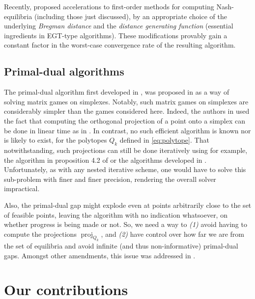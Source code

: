 \documentclass[a4paper,9pt]{extarticle}
\DeclareMathOperator{\proj}{proj}
\begin{document}
Recently, \cite{kroer2015} proposed accelerations to first-order
methods for computing Nash-equilibria (including those just
discussed), by an appropriate choice of the underlying \textit{Bregman
distance} and the \textit{distance generating function} (essential
ingredients in EGT-type algorithms). These modifications provably
gain a constant factor in the worst-case convergence rate of the
resulting algorithm. %

\subsection{Primal-dual algorithms}
The primal-dual algorithm first developed in \cite{chambolle2010}, was
proposed in \cite{chambolle2014ergodic} as a way of solving matrix
games on simplexes. Notably, such matrix games on
simplexes are considerably simpler than the games considered
here. Indeed, the authors in \cite{chambolle2014ergodic} used the fact
that computing the orthogonal projection of a point onto a simplex can
be done in linear time as in \cite{duchi2008efficient}. In contrast,
no such efficient algorithm is known nor is likely to exist, for the
polytopes $Q_k$ defined in \eqref{eq:polytope}. %
That notwithstanding, such projections can still be done iteratively
using for example, the algorithm in proposition 4.2 of
\cite{combettes2010dualization} or the algorithms developed in
\cite{tran2015splitting}. Unfortunately, as with any nested iterative
scheme, one would have to solve this sub-problem with finer and finer
precision, rendering the overall solver impractical.

 Also, the primal-dual gap might explode even at points arbitrarily
 close to the set of feasible points, leaving the algorithm with no
 indication whatsoever, on whether progress is being made or not. So,
 we need a way to \textit{(1)} avoid having to compute the projections
$\proj_{Q_k}$, and \textit{(2)} have control over how far we are from
the set of equilibria and avoid infinite (and thus non-informative)
primal-dual gaps. Amongst other amendments, this issue was addressed
in \cite{he2013accelerating}.

\section{Our contributions}
\label{sec:gsp}
\end{document}
